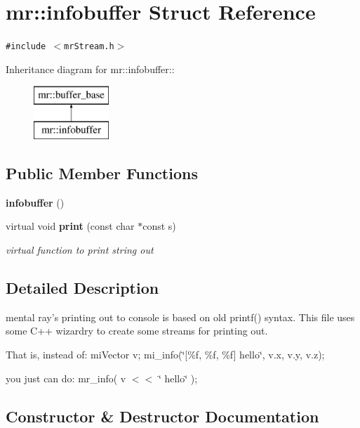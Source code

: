 \section{mr::infobuffer Struct Reference}
\label{structmr_1_1infobuffer}
{\tt \#include $<$mr\-Stream.h$>$}

Inheritance diagram for mr::infobuffer::\begin{figure}[H]
\begin{center}
\leavevmode
\includegraphics[height=2cm]{structmr_1_1infobuffer}
\end{center}
\end{figure}
\subsection*{Public Member Functions}
\begin{CompactItemize}
\item 
{\bf infobuffer} ()
\item 
virtual void {\bf print} (const char $\ast$const s)
\begin{CompactList}\small\item\em virtual function to print string out \item\end{CompactList}\end{CompactItemize}


\subsection{Detailed Description}
mental ray's printing out to console is based on old printf() syntax. This file uses some C++ wizardry to create some streams for printing out.

That is, instead of: mi\-Vector v; mi\_\-info(\char`\"{}[\%f, \%f, \%f] hello\char`\"{}, v.x, v.y, v.z);

you just can do: mr\_\-info( v $<$$<$ \char`\"{} hello\char`\"{} ); 



\subsection{Constructor \& Destructor Documentation}
